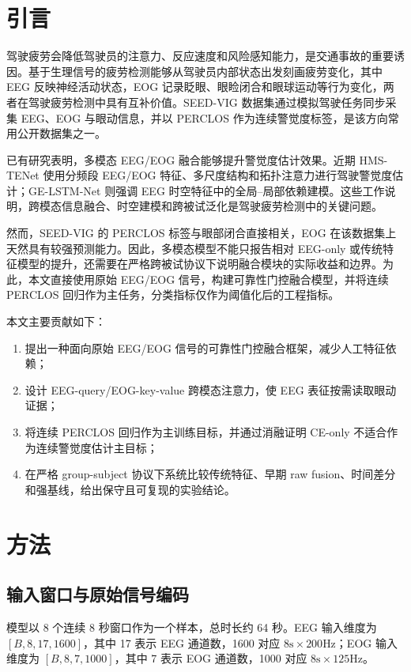 \documentclass[UTF8,a4paper,10.5pt,fontset=windows]{ctexart}
\begin{document}
\section{引言}
驾驶疲劳会降低驾驶员的注意力、反应速度和风险感知能力，是交通事故的重要诱因。基于生理信号的疲劳检测能够从驾驶员内部状态出发刻画疲劳变化，其中 EEG 反映神经活动状态，EOG 记录眨眼、眼睑闭合和眼球运动等行为变化，两者在驾驶疲劳检测中具有互补价值。SEED-VIG 数据集通过模拟驾驶任务同步采集 EEG、EOG 与眼动信息，并以 PERCLOS 作为连续警觉度标签，是该方向常用公开数据集之一\cite{seedvig,zheng2017}。

已有研究表明，多模态 EEG/EOG 融合能够提升警觉度估计效果\cite{zheng2017}。近期 HMS-TENet 使用分频段 EEG/EOG 特征、多尺度结构和拓扑注意力进行驾驶警觉度估计\cite{hmstenet2024}；GE-LSTM-Net 则强调 EEG 时空特征中的全局--局部依赖建模\cite{gelstm2026}。这些工作说明，跨模态信息融合、时空建模和跨被试泛化是驾驶疲劳检测中的关键问题。

然而，SEED-VIG 的 PERCLOS 标签与眼部闭合直接相关，EOG 在该数据集上天然具有较强预测能力。因此，多模态模型不能只报告相对 EEG-only 或传统特征模型的提升，还需要在严格跨被试协议下说明融合模块的实际收益和边界。为此，本文直接使用原始 EEG/EOG 信号，构建可靠性门控融合模型，并将连续 PERCLOS 回归作为主任务，分类指标仅作为阈值化后的工程指标。

本文主要贡献如下：
\begin{enumerate}
  \item 提出一种面向原始 EEG/EOG 信号的可靠性门控融合框架，减少人工特征依赖；
  \item 设计 EEG-query/EOG-key-value 跨模态注意力，使 EEG 表征按需读取眼动证据；
  \item 将连续 PERCLOS 回归作为主训练目标，并通过消融证明 CE-only 不适合作为连续警觉度估计主目标；
  \item 在严格 group-subject 协议下系统比较传统特征、早期 raw fusion、时间差分和强基线，给出保守且可复现的实验结论。
\end{enumerate}

\section{方法}
\subsection{输入窗口与原始信号编码}
模型以 8 个连续 8 秒窗口作为一个样本，总时长约 64 秒。EEG 输入维度为 $[B,8,17,1600]$，其中 17 表示 EEG 通道数，1600 对应 $8\text{s}\times200\text{Hz}$；EOG 输入维度为 $[B,8,7,1000]$，其中 7 表示 EOG 通道数，1000 对应 $8\text{s}\times125\text{Hz}$。
\end{document}
